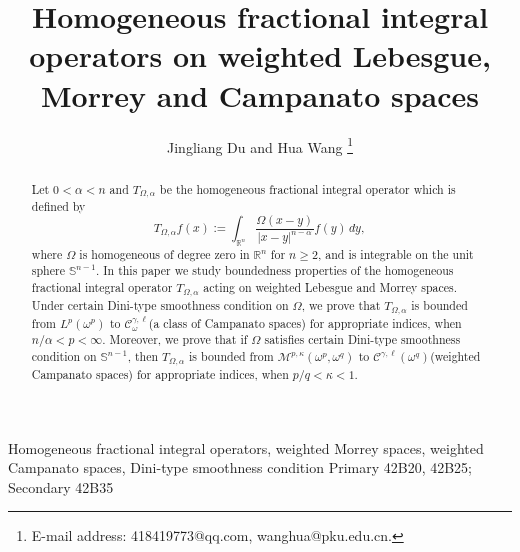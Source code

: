\documentclass[preprint,10pt]{elsarticle}
\numberwithin{equation}{section}
\begin{document}
\begin{frontmatter}

\title{Homogeneous fractional integral operators on weighted Lebesgue, Morrey and Campanato spaces}

\author{Jingliang Du and Hua Wang
\footnote{E-mail address: 418419773@qq.com, wanghua@pku.edu.cn.}}
\address{School of Mathematics and System Sciences, Xinjiang University,\\
Urumqi 830046, P. R. China\\
\textbf{Dedicated to the memory of Li Xue}}

\begin{abstract}
Let $0<\alpha<n$ and $T_{\Omega,\alpha}$ be the homogeneous fractional integral operator which is defined by
\begin{equation*}
T_{\Omega,\alpha}f(x):=\int_{\mathbb R^n}\frac{\Omega(x-y)}{|x-y|^{n-\alpha}}f(y)\,dy,
\end{equation*}
where $\Omega$ is homogeneous of degree zero in $\mathbb R^n$ for $n\geq2$, and is integrable on the unit sphere $\mathbb{S}^{n-1}$. In this paper we study boundedness properties of the homogeneous fractional integral operator $T_{\Omega,\alpha}$ acting on weighted Lebesgue and Morrey spaces. Under certain Dini-type smoothness condition on $\Omega$, we prove that $T_{\Omega,\alpha}$ is bounded from $L^{p}(\omega^p)$ to $\mathcal{C}^{\gamma,\ell}_{\omega}$(a class of Campanato spaces) for appropriate indices, when $n/{\alpha}<p<\infty$. Moreover, we prove that if $\Omega$ satisfies certain Dini-type smoothness condition on $\mathbb{S}^{n-1}$, then $T_{\Omega,\alpha}$ is bounded from $\mathcal{M}^{p,\kappa}(\omega^p,\omega^q)$ to $\mathcal{C}^{\gamma,\ell}(\omega^q)$(weighted Campanato spaces) for appropriate indices, when $p/q<\kappa<1$.
\end{abstract}

\begin{keyword}
Homogeneous fractional integral operators, weighted Morrey spaces, weighted Campanato spaces, Dini-type smoothness condition
\MSC[2020] Primary 42B20, 42B25; Secondary 42B35
\end{keyword}

\end{frontmatter}
\end{document}
